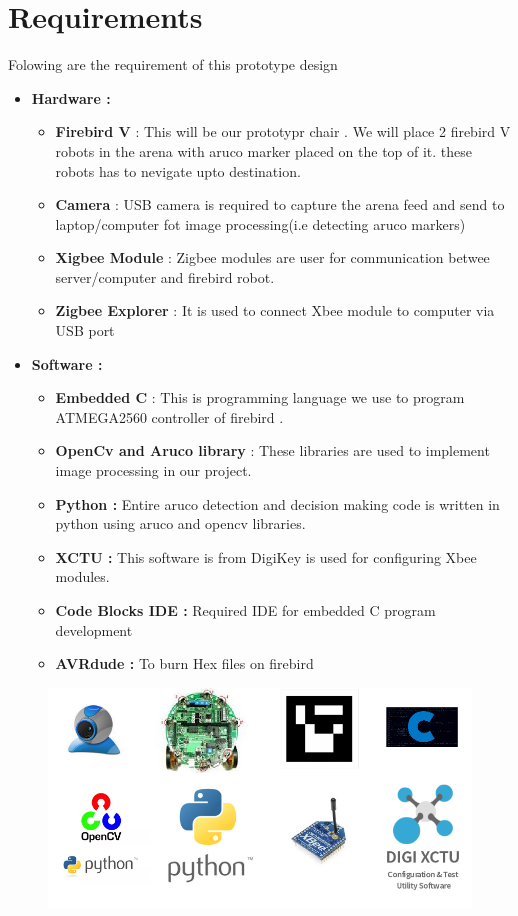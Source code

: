 \documentclass[]{exam}
\begin{document}
\section{\color{red} Requirements }
Folowing are the requirement of this prototype design 
\begin{itemize}
\item \textbf{Hardware :} 
\begin{itemize}
\item \textbf{Firebird V} : This will be our prototypr chair . We will place 2 firebird V robots in the arena with aruco marker placed on the top of it. these robots has to nevigate upto destination. 
\item \textbf{Camera }: USB camera is required to capture the arena feed and send to laptop/computer fot image processing(i.e detecting aruco markers)
\item \textbf{Xigbee Module} : Zigbee modules are user for communication betwee server/computer and firebird robot. 
\item \textbf{Zigbee Explorer} : It is used to connect Xbee module to computer via USB port 

\end{itemize}

\item \textbf{Software :} 
\begin{itemize}
\item \textbf{Embedded C} : This is programming language we use to program ATMEGA2560 controller of firebird . 
\item \textbf{OpenCv and Aruco library} : These libraries are used to implement image processing in our project. 
\item \textbf{Python :} Entire aruco detection and decision making code is written in python using aruco and opencv libraries.  
\item \textbf{XCTU : } This software is from DigiKey is used for configuring Xbee modules. 
\item \textbf{Code Blocks IDE :} Required IDE for embedded C program development 
\item \textbf{AVRdude :} To burn Hex files on firebird 
\end{itemize}
\end{itemize}
\begin{figure}[h!]


 \centering
 
  \includegraphics[scale=0.6]{req.png}
  
  \label{req}
  \end{figure}
\end{document}
